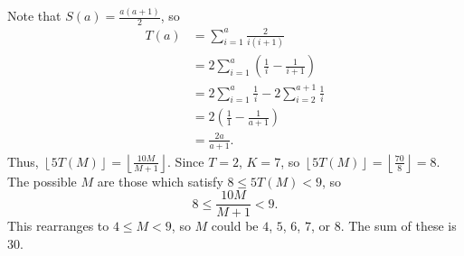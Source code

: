 Note that $S\left(a\right)=\frac{a\left(a+1\right)}{2}$, so \begin{align*}T\left(a\right)&=\displaystyle\sum_{i=1}^a\frac{2}{i\left(i+1\right)}\\&=2\displaystyle\sum_{i=1}^a\left(\frac{1}{i}-\frac{1}{i+1}\right)\\&=2\displaystyle\sum_{i=1}^a\frac{1}{i}-2\displaystyle\sum_{i=2}^{a+1}\frac{1}{i}\\&=2\left(\frac{1}{1}-\frac{1}{a+1}\right)\\&=\frac{2a}{a+1}.\end{align*} Thus, $\left\lfloor5T\left(M\right)\right\rfloor=\left\lfloor\frac{10M}{M+1}\right\rfloor$. Since $T=2$, $K=7$, so $\left\lfloor5T\left(M\right)\right\rfloor=\left\lfloor\frac{70}{8}\right\rfloor=8$. The possible $M$ are those which satisfy $8\leq5T\left(M\right)<9$, so \[8\leq\frac{10M}{M+1}<9.\] This rearranges to $4\leq M<9$, so $M$ could be $4$, $5$, $6$, $7$, or $8$. The sum of these is $\boxed{30}$.